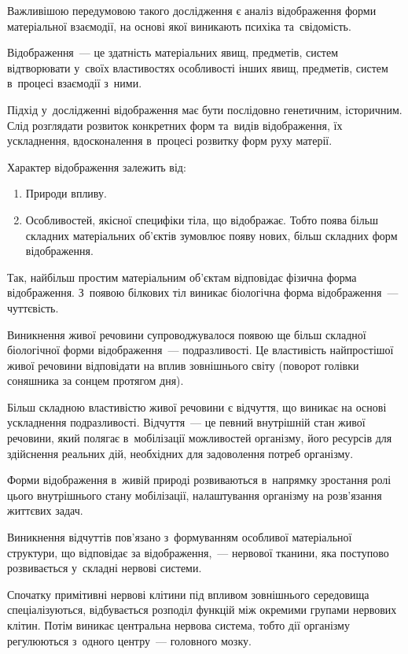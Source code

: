 \documentclass[a5paper,oneside,DIV=12,12pt,headings=small]{scrartcl}
\begin{document}
		Важливішою передумовою такого дослідження є аналіз відображення форми матеріальної взаємодії, на основі якої виникають психіка та~свідомість.

		Відображення~— це здатність матеріальних явищ, предметів, систем відтворювати у~своїх властивостях особливості інших явищ, предметів, систем в~процесі взаємодії з~ними.

		Підхід у~дослідженні відображення має бути послідовно генетичним, історичним. Слід розглядати розвиток конкретних форм та~видів відображення, їх ускладнення, вдосконалення в~процесі розвитку форм руху матерії.

		Характер відображення залежить від:
		\begin{enumerate}
			\item Природи впливу.
			\item Особливостей, якісної специфіки тіла, що відображає. Тобто поява більш складних матеріальних об'\-єк\-тів зумовлює появу нових, більш складних форм відображення.
		\end{enumerate}

		Так, найбільш простим матеріальним об'\-єк\-там відповідає фізична форма відображення. З~появою білкових тіл виникає біологічна форма відображення~— чуттєвість.

		Виникнення живої речовини супроводжувалося появою ще більш складної біологічної форми відображення~— подразливості. Це властивість найпростішої живої речовини відповідати на вплив зовнішнього світу (поворот голівки соняшника за сонцем протягом дня).

		Більш складною властивістю живої речовини є відчуття, що виникає на основі ускладнення подразливості. Відчуття~— це певний внутрішній стан живої речовини, який полягає в~мобілізації можливостей організму, його ресурсів для здійснення реальних дій, необхідних для задоволення потреб організму.

		Форми відображення в~живій природі розвиваються в~напрямку зростання ролі цього внутрішнього стану мобілізації, налаштування організму на роз\-в'я\-зан\-ня життєвих задач.

		Виникнення відчуттів пов'\-я\-за\-но з~формуванням особливої матеріальної структури, що відповідає за відображення,~— нервової тканини, яка поступово розвивається у~складні нервові системи.

		Спочатку примітивні нервові клітини під впливом зовнішнього середовища спеціалізуються, відбувається розподіл функцій між окремими групами нервових клітин. Потім виникає центральна нервова система, тобто дії організму регулюються з~одного центру~— головного мозку.
\end{document}
